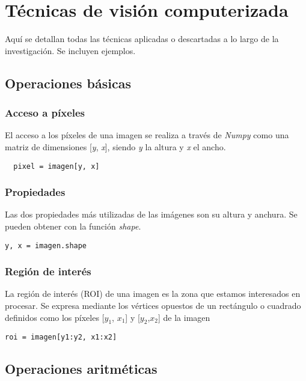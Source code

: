 \chapter{Técnicas de visión computerizada}
Aquí se detallan todas las técnicas aplicadas o descartadas 
a lo largo de la investigación. Se incluyen ejemplos.
\section{Operaciones básicas}
\subsection{Acceso a píxeles}
El acceso a los píxeles de una imagen se realiza a través de
\emph{Numpy} como una matriz de dimensiones [\emph{y}, \emph{x}],
siendo \emph{y} la altura y \emph{x} el ancho.
\begin{verbatim}
  pixel = imagen[y, x]
\end{verbatim}

\subsection{Propiedades}
Las dos propiedades más utilizadas de las imágenes son su altura y anchura.
Se pueden obtener con la función \emph{shape}.
\begin{verbatim}
y, x = imagen.shape
\end{verbatim}

\subsection{Región de interés}
La región de interés (ROI) de una imagen es la zona que estamos
interesados en procesar. Se expresa mediante los vértices opuestos de
un rectángulo o cuadrado definidos como los píxeles [$y_1$, $x_1$] y [$y_2$,$x_2$]
de la imagen
\begin{verbatim}
roi = imagen[y1:y2, x1:x2]
\end{verbatim}

\section{Operaciones aritméticas}
